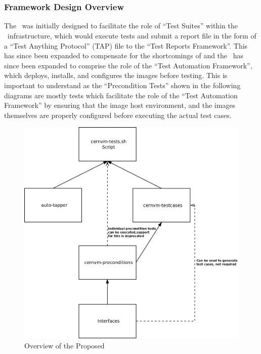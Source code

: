 \chapter{\cernvmtestframework}
\subsection{Framework Design Overview}
\label{sec:frameworkoverview}

The \cernvmtestframework\ was initially designed to facilitate the role of ``Test Suites'' within the \releasetesting~infrastructure, which would 
execute tests and submit a report file in the form of a ``Test Anything Protocol'' (TAP) file to the ``Test Reports Framework''. This has since been
expanded to compensate for the shortcomings of \tapper and the \cernvmtestframework\ has since been expanded to comprise the role of the ``Test
Automation Framework'', which deploys, installs, and configures the \cernvm images before testing. This is important to understand as the 
``Precondition Tests'' shown in the following diagrams are mostly tests which facilitate the role of the ``Test Automation Framework'' by ensuring
that the \cernvm image host environment, and the images themselves are properly configured before executing the actual \cernvmreleasetesting test
cases.

\begin{figure}[!hbp]
	\begin{center}
		\includegraphics[scale=0.19]{img/proposed_framework.png}
	\end{center}
	\caption{Overview of the Proposed \cernvmtestframework}
	\label{fig:proposedarchitecture}
\end{figure}

